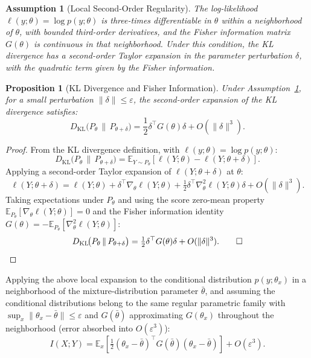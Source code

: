 \documentclass[10pt,a4paper]{amsart}
\newtheorem{proposition}{Proposition}
\newtheorem{assumption}{Assumption}
\newcommand{\E}{\mathbb{E}}
\begin{document}
\begin{assumption}[Local Second-Order Regularity]\label{ass:local-euclidean}
The log-likelihood $\ell(y;\theta)=\log p(y;\theta)$ is three-times
differentiable in $\theta$ within a neighborhood of $\theta$, with bounded
third-order derivatives, and the Fisher information matrix $G(\theta)$ is
continuous in that neighborhood.
Under this condition, the KL divergence has a second-order Taylor expansion
in the parameter perturbation $\delta$, with the quadratic term given by
the Fisher information.
\end{assumption}

\begin{proposition}[KL Divergence and Fisher Information]\label{prop:kl-fim}
Under Assumption~\ref{ass:local-euclidean}, for a small perturbation
$\|\delta\|\leq \varepsilon$, the second-order expansion of the KL
divergence satisfies:
\begin{equation}\label{eq:kl-fim}
D_{\mathrm{KL}}\!\big(P_{\theta}\,\|\,P_{\theta+\delta}\big)
  = \frac{1}{2}\delta^\top G(\theta)\delta + O(\|\delta\|^3).
\end{equation}
\end{proposition}

\begin{proof}
From the KL divergence definition, with $\ell(y;\theta)=\log p(y;\theta)$:
\[
D_{\mathrm{KL}}\!\big(P_{\theta}\,\|\,P_{\theta+\delta}\big)
  =\E_{Y\sim P_\theta}\!\left[\ell(Y;\theta)-\ell(Y;\theta+\delta)\right].
\]
Applying a second-order Taylor expansion of $\ell(Y;\theta+\delta)$ at $\theta$:
\[
\ell(Y;\theta+\delta)=\ell(Y;\theta)+\delta^\top \nabla_\theta \ell(Y;\theta)
  +\tfrac{1}{2}\delta^\top \nabla_\theta^2\ell(Y;\theta)\delta+O(\|\delta\|^3).
\]
Taking expectations under $P_\theta$ and using the score zero-mean property
$\E_{P_\theta}[\nabla_\theta \ell(Y;\theta)]=0$ and the Fisher information
identity $G(\theta)=-\E_{P_\theta}[\nabla_\theta^2\ell(Y;\theta)]$:
\[
D_{\mathrm{KL}}\!\big(P_{\theta}\,\|\,P_{\theta+\delta}\big)
  =\tfrac{1}{2}\delta^\top G(\theta)\delta+O(\|\delta\|^3). \qed
\]
\end{proof}

Applying the above local expansion to the conditional distribution
$p(y;\theta_x)$ in a neighborhood of the mixture-distribution parameter
$\bar\theta$, and assuming the conditional distributions belong to the same
regular parametric family with $\sup_x \|\theta_x-\bar\theta\| \leq \varepsilon$
and $G(\bar\theta)$ approximating $G(\theta_x)$ throughout the neighborhood
(error absorbed into $O(\varepsilon^3)$):
\begin{equation}\label{eq:mi-approx}
I(X;Y) = \E_x\!\left[\tfrac{1}{2}(\theta_x-\bar\theta)^\top
  G(\bar\theta)(\theta_x-\bar\theta)\right] + O\!\left(\varepsilon^3\right).
\end{equation}
\end{document}
